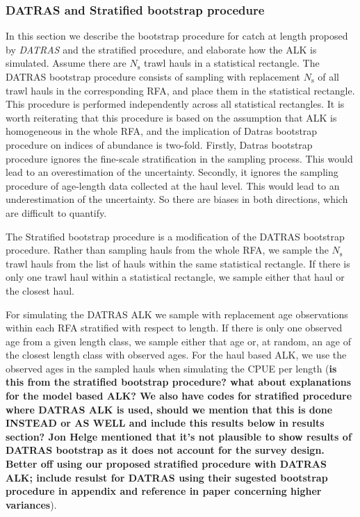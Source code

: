 \documentclass[a4paper 12pt]{article}
\numberwithin{equation}{section}
\begin{document}
\subsubsection{DATRAS and Stratified bootstrap procedure}
\label{sec:datrasstratifiedbootstrap}
In this section we describe the bootstrap procedure for catch at length proposed by \emph{DATRAS} \citep{ICES2013} and the stratified procedure, and elaborate how the ALK is simulated. Assume there are $N_{\text{s}}$ trawl hauls in a statistical rectangle. The DATRAS bootstrap procedure consists of sampling with replacement $N_{\text{s}}$ of all trawl hauls in the corresponding RFA, and place them in the statistical rectangle. This procedure is performed independently across all statistical rectangles. It is worth reiterating that this procedure is based on the assumption that ALK is homogeneous in the whole RFA, and the implication of Datras bootstrap procedure on indices of abundance is two-fold. Firstly, Datras bootstrap procedure ignores the fine-scale stratification in the sampling process. This would lead to an overestimation of the uncertainty. Secondly, it ignores the sampling procedure of age-length data collected at the haul level. This would lead  to an underestimation of the uncertainty. So there are biases in both directions, which are difficult to quantify.

The Stratified bootstrap procedure is a modification of the DATRAS bootstrap procedure. Rather than sampling hauls from the whole RFA, we  sample the $N_{\text{s}}$ trawl hauls from the list of hauls within the same statistical rectangle. If there is only one trawl haul within a statistical rectangle, we sample either that haul or the closest haul.

For simulating the DATRAS ALK we sample with replacement age observations within each RFA stratified with respect to length. If there is only one observed age from a given length class, we sample either that age or, at random, an age of the closest length class with observed ages. For the haul based ALK, we use the observed ages in the sampled hauls when simulating the CPUE per length ({\bf is this from the stratified bootstrap procedure? what about explanations for the model based ALK? We also have codes for stratified procedure where DATRAS ALK is used, should we mention that this is done INSTEAD or AS WELL and include this results below in results section? Jon Helge mentioned that it's not plausible to show results of DATRAS bootstrap as it does not account for the survey design. Better off using our proposed stratified procedure with DATRAS ALK; include resulst for DATRAS using their sugested bootstrap procedure in appendix and reference in paper concerning higher variances}).
\end{document}
